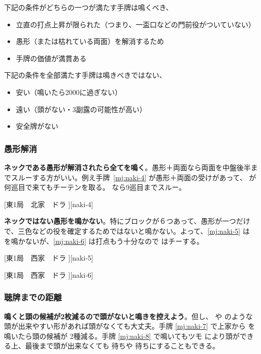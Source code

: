 \documentclass[../nankiru_main.tex]{subfiles}
\begin{document}
下記の条件がどちらの一つが満たす手牌は鳴くべき\citep[][pp. 36--41, p. 45, pp. 58--61]{hirasawa-naki}、

\begin{itemize}
\item 立直の打点上昇が限られた（つまり、一盃口などの門前役がついていない）
\item 愚形（または枯れている両面）を解消するため
\item 手牌の価値が満貫ある
\end{itemize}

下記の条件を全部満たす手牌は鳴きべきではない、

\begin{itemize}
\item 安い（鳴いたら2000に過ぎない）
\item 遠い（頭がない・3副露の可能性が高い）
\item 安全牌がない
\end{itemize}


\subsubsection*{愚形解消}

\textbf{ネックである愚形が解消されたら全てを鳴く}\citep[][p.~40]{hirasawa-naki}。愚形＋両面なら両面を中盤後半までスルーする方がいい。例え手牌~\ref{mj:naki-4} が愚形＋両面の受けがあって、 が何巡目で来てもチーテンを取る。 なら9巡目までスルー。

[東1局　北家　ドラ ][naki-4]

\textbf{ネックではない愚形を鳴かない}\citep[][p.~40]{hirasawa-naki}。特にブロックが６つあって、愚形が一つだけで、三色などの役を確定するためではないと鳴かない。よって、\ref{mj:naki-5} は  を鳴かないが、\ref{mj:naki-6} は打点もう十分なので  はチーする。

[東1局　西家　ドラ ][naki-5]

[東1局　西家　ドラ ][naki-6]


\subsubsection*{聴牌までの距離} 

\textbf{鳴くと頭の候補が2枚減るので頭がないと鳴きを控えよう}\citep[][p.~55]{hirasawa-naki}。但し、 や  のような頭が出来やすい形があれば頭がなくても大丈夫。手牌 \ref{mj:naki-7} で上家から  を鳴いたら頭の候補が  2種減る。手牌 \ref{mj:naki-8} で鳴いてもツモ  により頭ができる上、最後まで頭が出来なくても  待ちや  待ちにすることもできる。
\end{document}

